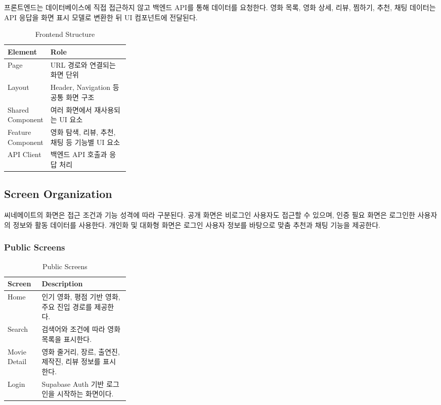 \documentclass[11pt,a4paper]{article}
\renewcommand{\arraystretch}{1.18}
\begin{document}
프론트엔드는 데이터베이스에 직접 접근하지 않고 백엔드 API를 통해 데이터를 요청한다. 영화 목록, 영화 상세, 리뷰, 찜하기, 추천, 채팅 데이터는 API 응답을 화면 표시 모델로 변환한 뒤 UI 컴포넌트에 전달된다.

\begin{table}[H]
\centering
\small
\setlength{\tabcolsep}{5pt}
\renewcommand{\arraystretch}{1.28}
\begin{tabularx}{\linewidth}{@{}>{\RaggedRight\arraybackslash}p{0.28\linewidth}>{\RaggedRight\arraybackslash}X@{}}
\toprule
\textbf{Element} & \textbf{Role} \\
\midrule
Page & URL 경로와 연결되는 화면 단위 \\
Layout & Header, Navigation 등 공통 화면 구조 \\
Shared Component & 여러 화면에서 재사용되는 UI 요소 \\
Feature Component & 영화 탐색, 리뷰, 추천, 채팅 등 기능별 UI 요소 \\
API Client & 백엔드 API 호출과 응답 처리 \\
\bottomrule
\end{tabularx}
\caption{Frontend Structure}
\end{table}

\hypertarget{screen-organization}{%
\subsection{Screen Organization}\label{screen-organization}}

씨네메이트의 화면은 접근 조건과 기능 성격에 따라 구분된다. 공개 화면은 비로그인 사용자도 접근할 수 있으며, 인증 필요 화면은 로그인한 사용자의 정보와 활동 데이터를 사용한다. 개인화 및 대화형 화면은 로그인 사용자 정보를 바탕으로 맞춤 추천과 채팅 기능을 제공한다.

\hypertarget{public-screens}{%
\subsubsection{Public Screens}\label{public-screens}}

\begin{table}[H]
\centering
\small
\setlength{\tabcolsep}{5pt}
\renewcommand{\arraystretch}{1.28}
\begin{tabularx}{\linewidth}{@{}>{\RaggedRight\arraybackslash}p{0.28\linewidth}>{\RaggedRight\arraybackslash}X@{}}
\toprule
\textbf{Screen} & \textbf{Description} \\
\midrule
Home & 인기 영화, 평점 기반 영화, 주요 진입 경로를 제공한다. \\
Search & 검색어와 조건에 따라 영화 목록을 표시한다. \\
Movie Detail & 영화 줄거리, 장르, 출연진, 제작진, 리뷰 정보를 표시한다. \\
Login & Supabase Auth 기반 로그인을 시작하는 화면이다. \\
\bottomrule
\end{tabularx}
\caption{Public Screens}
\end{table}
\end{document}

